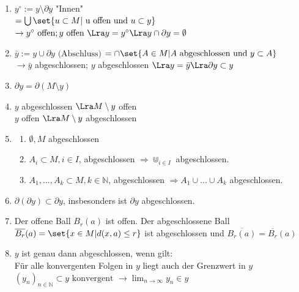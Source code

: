 \begin{enumerate}
    \item $ y^\circ := y \setminus \partial y$ "Innen" \\
        $= \bigcup \set{u \subset M | \text{ u offen und } u \subset y}$ \\
        $\rightarrow y^\circ \text{ offen}; y \text{ offen } \Lra y = y ^\circ \Lra y \cap \partial y = \emptyset$
    \item $\bar y := y \cup \partial y \text{ (Abschluss)}$
        $= \cap \set{A \in M | A \text{ abgeschlossen und } y \subset A}$ \\
        $\rightarrow \bar y$ abgeschlossen; $y$ abgeschlossen $\Lra y = \bar y \Lra \partial y \subset y$
    \item $\partial y = \partial (M \setminus y)$
    \item $y$ abgeschlossen $\Lra M \setminus y$ offen \\
    $y$ offen $\Lra M \setminus y$ abgeschlossen
    \item
        \begin{enumerate}
            \item $\emptyset, M$ abgeschlossen
            \item $A_i \subset M, i \in I$, abgeschlossen $\Rightarrow \displaystyle\Cup_{i \in I}$ abgeschlossen.
            \item $A_1,...,A_k \subset M, k \in \mathbb{N}$, abgeschlossen $\Rightarrow A_1 \cup ... \cup A_k$ abgeschlossen.
        \end{enumerate}
    \item $\partial (\partial y) \subset \partial y$, insbesonders ist $\partial y$ abgeschlossen.
    \item Der offene Ball $B_r(a)$ ist offen. Der abgeschlossene Ball $\overline{B_r}(a) = \set{x \in M | d(x,a) \le r}$ ist abgeschlossen und $\overline{ B_r(a)} = \overline{B_r}(a)$
    \item $y$ ist genau dann abgeschlossen, wenn gilt: \\
    Für alle konvergenten Folgen in $y$ liegt auch der Grenzwert in $y$ \\
    $(y_n)_{n \in \mathbb{N}} \subset y \text{ konvergent } \rightarrow \displaystyle\lim_{n\rightarrow \infty}y_n \in y$
\end{enumerate}
